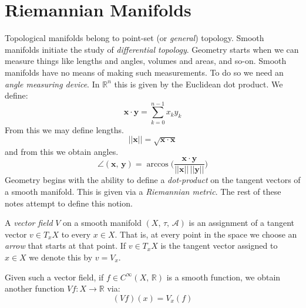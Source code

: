 \documentclass{article}
\theoremstyle{plain}
\theoremstyle{normal}
\begin{document}
    \section{Riemannian Manifolds}
        Topological manifolds belong to point-set (or \textit{general})
        topology. Smooth manifolds initiate the study of
        \textit{differential topology}. Geometry starts when we can measure
        things like lengths and angles, volumes and areas, and so-on. Smooth
        manifolds have no means of making such measurements. To do so we need
        an \textit{angle measuring device}. In $\mathbb{R}^{n}$ this is given
        by the Euclidean dot product. We define:
        \begin{equation}
            \mathbf{x}\cdot\mathbf{y}=
                \sum_{k=0}^{n-1}x_{k}y_{k}
        \end{equation}
        From this we may define lengths.
        \begin{equation}
            ||\mathbf{x}||=\sqrt{\mathbf{x}\cdot\mathbf{x}}
        \end{equation}
        and from this we obtain angles.
        \begin{equation}
            \angle(\mathbf{x},\,\mathbf{y})=
            \arccos\Big(
                \frac{\mathbf{x}\cdot\mathbf{y}}{||\mathbf{x}||\,||\mathbf{y}||}
            \Big)
        \end{equation}
        Geometry begins with the ability to define a \textit{dot-product}
        on the tangent vectors of a smooth manifold. This is given via a
        \textit{Riemannian metric}. The rest of these notes attempt to define
        this notion.
        \par\hfill\par
        A \textit{vector field} $V$ on a smooth manifold
        $(X,\,\tau,\,\mathcal{A})$ is an assignment of a tangent vector
        $v\in{T}_{x}X$ to every $x\in{X}$. That is, at every point in the space
        we choose an \textit{arrow} that starts at that point. If
        $v\in{T}_{x}X$ is the tangent vector assigned to $x\in{X}$ we denote
        this by $v=V_{x}$.
        \par\hfill\par
        Given such a vector field, if $f\in{C}^{\infty}(X,\,\mathbb{R})$ is a
        smooth function, we obtain another function $Vf:X\rightarrow\mathbb{R}$
        via:
        \begin{equation}
            (Vf)(x)=V_{x}(f)
        \end{equation}
\end{document}
